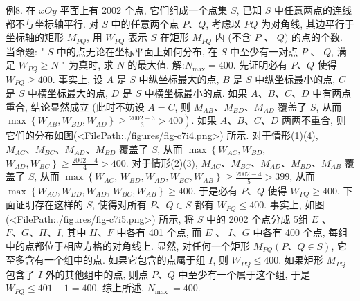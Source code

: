 例8. 在 $x O y$ 平面上有 2002 个点, 它们组成一个点集 $S$, 已知 $S$ 中任意两点的连线都不与坐标轴平行.
对 $S$ 中的任意两个点 $P 、 Q$, 考虑以 $P Q$ 为对角线, 其边平行于坐标轴的矩形 $M_{P Q}$, 用 $W_{P Q}$ 表示 $S$ 在矩形 $M_{P Q}$ 内 (不含 $P$ 、 $Q)$ 的点的个数.
当命题: " $S$ 中的点无论在坐标平面上如何分布, 在 $S$ 中至少有一对点 $P$ 、 $Q$, 满足 $W_{P Q} \geqslant N$ " 为真时, 求 $N$ 的最大值.
解:$N_{\max }=400$. 先证明必有 $P 、 Q$ 使得 $W_{P Q} \geqslant 400$. 事实上, 设 $A$ 是 $S$ 中纵坐标最大的点, $B$ 是 $S$ 中纵坐标最小的点, $C$ 是 $S$ 中横坐标最大的点, $D$ 是 $S$ 中横坐标最小的点.
如果 $A 、 B 、 C 、 D$ 中有两点重合, 结论显然成立 (此时不妨设 $A=C$, 则 $M_{A B} 、 M_{B D} 、 M_{A D}$ 覆盖了 $S$, 从而 $\max \left\{W_{A B}, W_{B D}, W_{A D}\right\} \geqslant \left.\frac{2002-3}{3}>400\right)$. 如果 $A 、 B 、 C 、 D$ 两两不重合, 则它们的分布如图(<FilePath:./figures/fig-c7i4.png>) 所示.
对于情形(1)(4), $M_{A C} 、 M_{B C} 、 M_{A D} 、 M_{B D}$ 覆盖了 $S$, 从而 $\max \left\{W_{A C}, W_{B D}\right.$, $\left.W_{A D}, W_{B C}\right\} \geqslant \frac{2002-4}{4}>400$.
对于情形(2)(3), $M_{A C} 、 M_{B C} 、 M_{A D} 、 M_{B D} 、 M_{A B}$ 覆盖了 $S$, 从而 $\max \left\{W_{A C}\right.$, $\left.W_{B D}, W_{A D}, W_{B C}, W_{A B}\right\} \geqslant \frac{2002-4}{5}>399$, 从而 $\max \left\{W_{A C}, W_{B D}, W_{A D}\right.$, $\left.W_{B C}, W_{A B}\right\} \geqslant 400$. 于是必有 $P 、 Q$ 使得 $W_{P Q} \geqslant 400$.
下面证明存在这样的 $S$, 使得对所有 $P 、 Q \in S$ 都有 $W_{P Q} \leqslant 400$. 事实上, 如图(<FilePath:./figures/fig-c7i5.png>) 所示, 将 $S$ 中的 2002 个点分成 5组 $E$ 、 $F 、 G 、 H 、 I$, 其中 $H 、 F$ 中各有 401 个点, 而 $E$ 、 $I 、 G$ 中各有 400 个点, 每组中的点都位于相应方格的对角线上.
显然, 对任何一个矩形 $M_{P Q} (P 、 Q \in S)$, 它至多含有一个组中的点.
如果它包含的点属于组 $I$, 则 $W_{P Q} \leqslant 400$. 如果矩形 $M_{P Q}$ 包含了 $I$ 外的其他组中的点, 则点 $P 、 Q$ 中至少有一个属于这个组, 于是 $W_{P Q} \leqslant 401-1=400$.
综上所述, $N_{\text {max }}=400$.



